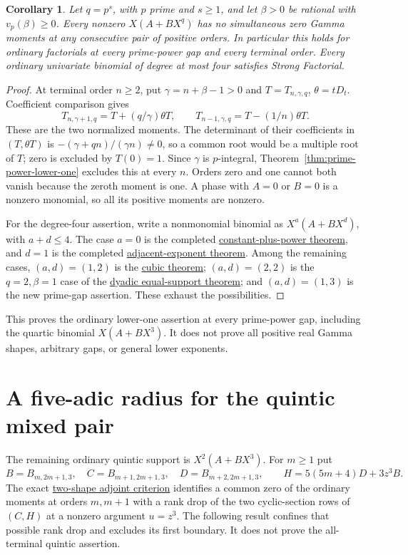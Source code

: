 \documentclass[11pt]{article}
\newtheorem{corollary}[theorem]{Corollary}
\begin{document}
\begin{corollary}\label{cor:prime-gap-lower-one}\label{cor:prime-power-lower-one}
Let $q=p^s$, with $p$ prime and $s\ge1$, and let $\beta>0$
be rational with $v_p(\beta)\ge0$. Every nonzero $X(A+BX^q)$ has no simultaneous zero
Gamma moments at any consecutive pair of positive orders.
In particular this holds for ordinary factorials at every prime-power gap
and every terminal order. Every ordinary univariate binomial of
degree at most four satisfies Strong Factorial.
\end{corollary}
\begin{proof}
At terminal order $n\ge2$, put $\gamma=n+\beta-1>0$ and
$T=T_{n,\gamma,q}$, $\theta=tD_t$. Coefficient comparison gives
\[
 T_{n,\gamma+1,q}=T+(q/\gamma)\theta T,\qquad
 T_{n-1,\gamma,q}=T-(1/n)\theta T.
\]
These are the two normalized moments. The determinant of their
coefficients in $(T,\theta T)$ is
$-(\gamma+qn)/(\gamma n)\ne0$, so a common root would be a
multiple root of $T$; zero is excluded by $T(0)=1$.
Since $\gamma$ is $p$-integral, Theorem~\ref{thm:prime-power-lower-one}
excludes this at every $n$.
Orders zero and one cannot both vanish because the zeroth moment
is one. A phase with $A=0$ or $B=0$ is a nonzero monomial, so all
its positive moments are nonzero.

For the degree-four assertion, write a nonmonomial binomial as
$X^a(A+BX^d)$, with $a+d\le4$.
The case $a=0$ is the completed
\href{ALL_UNIVARIATE_TWO_TERM_SFC.tex}{constant-plus-power theorem},
and $d=1$ is the completed
\href{UNIFORM_PADE_PARABOLA_SFC.tex}{adjacent-exponent theorem}.
Among the remaining cases, $(a,d)=(1,2)$ is the
\href{CUBIC_ADJOINT_STABILITY_SFC.tex}{cubic theorem};
$(a,d)=(2,2)$ is the $q=2,\beta=1$ case of the
\href{DYADIC_BINOMIAL_SFC.tex}{dyadic equal-support theorem};
and $(a,d)=(1,3)$ is the new prime-gap assertion.
These exhaust the possibilities.
\end{proof}
This proves the ordinary lower-one assertion at every prime-power gap,
including the quartic binomial $X(A+BX^3)$.
It does not prove all positive real Gamma shapes, arbitrary gaps,
or general lower exponents.

\section{A five-adic radius for the quintic mixed pair}
The remaining ordinary quintic support is $X^2(A+BX^3)$.
For $m\ge1$ put
\[
 B=B_{m,2m+1,3},\quad C=B_{m+1,2m+1,3},\quad
 D=B_{m+2,2m+1,3},\qquad
 H=5(5m+4)D+3z^3B .
\]
The exact \href{lower_exponent_initial_and_boundary.tex}{two-shape
adjoint criterion} identifies a common zero of the ordinary moments
at orders $m,m+1$ with a rank drop of the two cyclic-section rows
of $(C,H)$ at a nonzero argument $u=z^3$.
The following result confines that possible rank drop and excludes its first boundary. It does not prove the
all-terminal quintic assertion.
\end{document}
